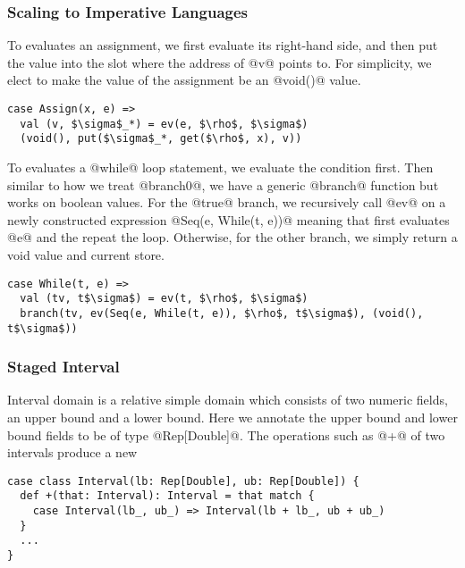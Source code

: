 \subsubsection{Scaling to Imperative Languages}

To evaluates an assignment, we first evaluate its right-hand side, and then put
the value into the slot where the address of @v@ points to. For simplicity, we
elect to make the value of the assignment be an @void()@ value.
\begin{lstlisting}
case Assign(x, e) =>
  val (v, $\sigma$_*) = ev(e, $\rho$, $\sigma$)
  (void(), put($\sigma$_*, get($\rho$, x), v))
\end{lstlisting}

To evaluates a @while@ loop statement, we evaluate the condition first. Then
similar to how we treat @branch0@, we have a generic @branch@ function but works
on boolean values. For the @true@ branch, we recursively call @ev@ on a newly
constructed expression @Seq(e, While(t, e))@ meaning that first evaluates @e@
and the repeat the loop. Otherwise, for the other branch, we simply return a
void value and current store.
\begin{lstlisting}
case While(t, e) =>
  val (tv, t$\sigma$) = ev(t, $\rho$, $\sigma$)
  branch(tv, ev(Seq(e, While(t, e)), $\rho$, t$\sigma$), (void(), t$\sigma$))
\end{lstlisting}

\subsubsection{Staged Interval}

Interval domain is a relative simple domain which consists of two numeric
fields, an upper bound and a lower bound. Here we annotate the upper bound and
lower bound fields to be of type @Rep[Double]@. The operations such as @+@ of
two intervals produce a new
\begin{lstlisting}
case class Interval(lb: Rep[Double], ub: Rep[Double]) {
  def +(that: Interval): Interval = that match {
    case Interval(lb_, ub_) => Interval(lb + lb_, ub + ub_)
  }
  ...
}
\end{lstlisting}

\fi
